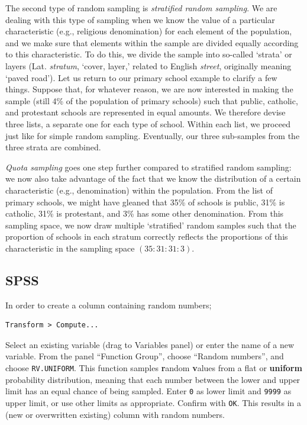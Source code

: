 \documentclass[
]{book}
\begin{document}
The second type of random sampling is \emph{stratified random sampling}. We are dealing with this type of sampling when we know the value of a particular characteristic (e.g., religious denomination) for each element of the population, and we make sure that elements within the sample are divided equally according to this characteristic. To do this, we divide the sample into so-called `strata' or layers (Lat. \emph{stratum}, `cover, layer,' related to English \emph{street}, originally meaning `paved road'). Let us return to our primary school example to clarify a few things. Suppose that, for whatever reason, we are now interested in making the sample (still 4\% of the population of primary schools) such that public, catholic, and protestant schools are represented in equal amounts. We therefore devise three lists, a separate one for each type of school. Within each list, we proceed just like for simple random sampling. Eventually, our three sub-samples from the three strata are combined.

\emph{Quota sampling} goes one step further compared to stratified random sampling: we now also take advantage of the fact that we know the distribution of a certain characteristic (e.g., denomination) within the population. From the list of primary schools, we might have gleaned that 35\% of schools is public, 31\% is catholic, 31\% is protestant, and 3\% has some other denomination. From this sampling space, we now draw multiple `stratified' random samples such that the proportion of schools in each stratum correctly reflects the proportions of this characteristic in the sampling space \((35 : 31 : 31 : 3)\).

\hypertarget{spss}{%
\subsection{SPSS}\label{spss}}

In order to create a column containing random numbers;

\begin{verbatim}
Transform > Compute...
\end{verbatim}

Select an existing variable (drag to Variables panel) or enter the name of a new variable.
From the panel ``Function Group'', choose ``Random numbers'', and choose \texttt{RV.UNIFORM}.
This function samples \textbf{r}andom \textbf{v}alues from a flat or \textbf{uniform} probability distribution, meaning that each number between the lower and upper limit has an equal chance of being sampled.
Enter \texttt{0} as lower limit and \texttt{9999} as upper limit, or use other limits as appropriate.
Confirm with \texttt{OK}.
This results in a (new or overwritten existing) column with random numbers.
\end{document}

